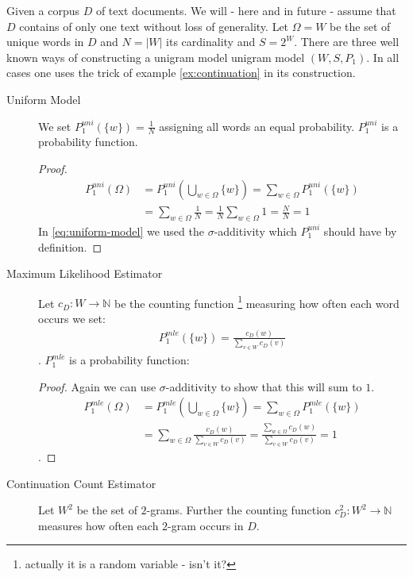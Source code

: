 \documentclass[•]{book}
\begin{document}
\begin{example}\label{ex:unigram-model}
Given a corpus $D$ of text documents. We will - here and in future - assume that $D$ contains of only one text without loss of generality.  Let $\Omega=W$ be the set of unique words in $D$ and $N = |W|$ its cardinality and $S=2^{W}$. There are three well known ways of constructing a unigram model unigram model $(W,S,P_1)$. In all cases one uses the trick of example \ref{ex:continuation} in its construction. 
\begin{description}
\item[Uniform Model] We set $P_1^{uni}(\{w\})=\frac{1}{N}$ assigning all words an equal probability.  $P_1^{uni}$ is a probability function. 
\begin{proof}
\begin{align}
P_1^{uni}(\Omega) & = P_1^{uni}(\bigcup_{w\in\Omega}\{w\}) = \sum_{w\in\Omega}P_1^{uni}(\{w\}) \label{eq:uniform-model}\\
 &  = \sum_{w\in\Omega}\frac{1}{N}  =  \frac{1}{N} \sum_{w\in\Omega}1= \frac{N}{N} = 1 
\end{align}
In \ref{eq:uniform-model} we used the $\sigma$-additivity which $P_1^{uni}$ should have by definition. 
\end{proof}
\item[Maximum Likelihood Estimator]  Let $c_D:W\longrightarrow\mathbb{N}$ be  the counting function \footnote{actually it is a random variable - isn't it?} measuring  how often each word occurs we set: 
\begin{align}
P_1^{mle}(\{w\})=\frac{c_D(w)}{\sum_{v\in W}c_D(v)}
\end{align}. 
$P_1^{mle}$ is a probability function:
\begin{proof}
Again we can use $\sigma$-additivity to show that this will sum to $1$. 
\begin{align}
P_1^{mle}(\Omega) & = P_1^{mle}(\bigcup_{w\in\Omega}\{w\}) = \sum_{w\in\Omega}P_1^{mle}(\{w\} )  \\
& =  \sum_{w\in\Omega} \frac{c_D(w)}{\sum_{v\in W}c_D(v)} = \frac{\sum_{w\in \Omega}c_D(w)}{\sum_{v\in W}c_D(v)} = 1
\end{align}
.
\end{proof}
\item[Continuation Count Estimator] Let $W^2$ be the set of $2$-grams. 
Further the counting function $c_D^2:W^2\longrightarrow \mathbb{N}$ measures how often each $2$-gram occurs in $D$. 

\end{description}
\end{example}
\end{document}
